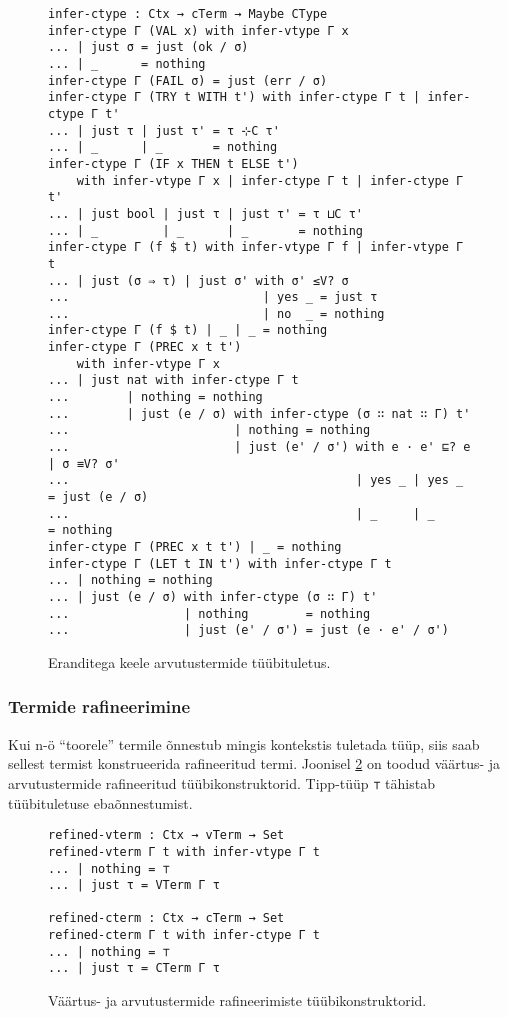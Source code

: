 \documentclass[a4paper,12pt]{article}
\begin{document}
\begin{figure}
  \begin{BVerbatim}
infer-ctype : Ctx → cTerm → Maybe CType
infer-ctype Γ (VAL x) with infer-vtype Γ x
... | just σ = just (ok / σ)
... | _      = nothing
infer-ctype Γ (FAIL σ) = just (err / σ)
infer-ctype Γ (TRY t WITH t') with infer-ctype Γ t | infer-ctype Γ t'
... | just τ | just τ' = τ ⊹C τ'
... | _      | _       = nothing
infer-ctype Γ (IF x THEN t ELSE t')
    with infer-vtype Γ x | infer-ctype Γ t | infer-ctype Γ t'
... | just bool | just τ | just τ' = τ ⊔C τ'
... | _         | _      | _       = nothing
infer-ctype Γ (f $ t) with infer-vtype Γ f | infer-vtype Γ t
... | just (σ ⇒ τ) | just σ' with σ' ≤V? σ
...                           | yes _ = just τ
...                           | no  _ = nothing
infer-ctype Γ (f $ t) | _ | _ = nothing
infer-ctype Γ (PREC x t t')
    with infer-vtype Γ x
... | just nat with infer-ctype Γ t
...        | nothing = nothing
...        | just (e / σ) with infer-ctype (σ ∷ nat ∷ Γ) t'
...                       | nothing = nothing
...                       | just (e' / σ') with e · e' ⊑? e | σ ≡V? σ'
...                                        | yes _ | yes _ = just (e / σ)
...                                        | _     | _     = nothing
infer-ctype Γ (PREC x t t') | _ = nothing
infer-ctype Γ (LET t IN t') with infer-ctype Γ t 
... | nothing = nothing
... | just (e / σ) with infer-ctype (σ ∷ Γ) t'
...                | nothing        = nothing
...                | just (e' / σ') = just (e · e' / σ')
  \end{BVerbatim}
  \caption{Eranditega keele arvutustermide tüübituletus.}
  \label{fig:exc.infer-ctype}
\end{figure}

\subsubsection{Termide rafineerimine}

Kui n-ö ``toorele'' termile õnnestub mingis kontekstis tuletada tüüp, siis saab sellest termist konstrueerida rafineeritud termi.
Joonisel \ref{fig:exc.infer-term-type} on toodud väärtus- ja arvutustermide rafineeritud tüübikonstruktorid.
Tipp-tüüp {\tt ⊤} tähistab tüübituletuse ebaõnnestumist.
\begin{figure}
  \begin{BVerbatim}
refined-vterm : Ctx → vTerm → Set
refined-vterm Γ t with infer-vtype Γ t 
... | nothing = ⊤
... | just τ = VTerm Γ τ

refined-cterm : Ctx → cTerm → Set
refined-cterm Γ t with infer-ctype Γ t 
... | nothing = ⊤
... | just τ = CTerm Γ τ
  \end{BVerbatim}
  \caption{Väärtus- ja arvutustermide rafineerimiste tüübikonstruktorid.}
  \label{fig:exc.infer-term-type}
\end{figure}
\end{document}
